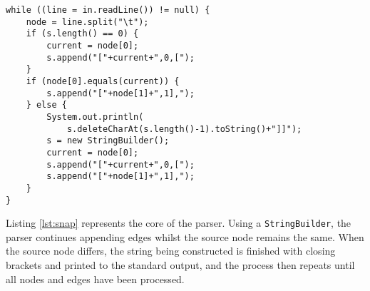 \begin{lstlisting}[float]
while ((line = in.readLine()) != null) {
	node = line.split("\t");
	if (s.length() == 0) {
		current = node[0];
		s.append("["+current+",0,[");
	}
	if (node[0].equals(current)) {
		s.append("["+node[1]+",1],");
	} else {
		System.out.println(
			s.deleteCharAt(s.length()-1).toString()+"]]");
		s = new StringBuilder();
		current = node[0];
		s.append("["+current+",0,[");
		s.append("["+node[1]+",1],");
	}
}
\end{lstlisting}

Listing \ref{lst:snap} represents the core of the parser. Using a \verb/StringBuilder/, the parser continues appending edges whilst the source node remains the same. When the source node differs, the string being constructed is finished with closing brackets and printed to the standard output, and the process then repeats until all nodes and edges have been processed.